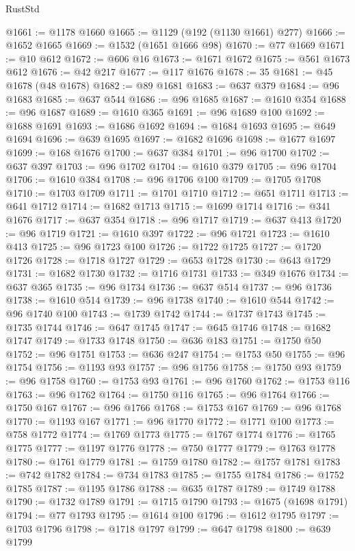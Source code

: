 \begin{lexlean}{RustStd}
\begin{coremodule}
@1661 := @1178 @1660
@1665 := @1129 (@192 (@1130 @1661) @277)
@1666 := @1652 @1665
@1669 := @1532 (@1651 @1666 @98)
@1670 := @77 @1669
@1671 := @10 @612
@1672 := @606 @16
@1673 := @1671 @1672
@1675 := @561 @1673 @612
@1676 := @42 @217
@1677 := @117 @1676
@1678 := 35
@1681 := @45 @1678 (@48 @1678)
@1682 := @89 @1681
@1683 := @637 @379
@1684 := @96 @1683
@1685 := @637 @544
@1686 := @96 @1685
@1687 := @1610 @354
@1688 := @96 @1687
@1689 := @1610 @365
@1691 := @96 @1689 @100
@1692 := @1688 @1691
@1693 := @1686 @1692
@1694 := @1684 @1693
@1695 := @649 @1694
@1696 := @639 @1695
@1697 := @1682 @1696
@1698 := @1677 @1697
@1699 := @168 @1676
@1700 := @637 @384
@1701 := @96 @1700
@1702 := @637 @397
@1703 := @96 @1702
@1704 := @1610 @379
@1705 := @96 @1704
@1706 := @1610 @384
@1708 := @96 @1706 @100
@1709 := @1705 @1708
@1710 := @1703 @1709
@1711 := @1701 @1710
@1712 := @651 @1711
@1713 := @641 @1712
@1714 := @1682 @1713
@1715 := @1699 @1714
@1716 := @341 @1676
@1717 := @637 @354
@1718 := @96 @1717
@1719 := @637 @413
@1720 := @96 @1719
@1721 := @1610 @397
@1722 := @96 @1721
@1723 := @1610 @413
@1725 := @96 @1723 @100
@1726 := @1722 @1725
@1727 := @1720 @1726
@1728 := @1718 @1727
@1729 := @653 @1728
@1730 := @643 @1729
@1731 := @1682 @1730
@1732 := @1716 @1731
@1733 := @349 @1676
@1734 := @637 @365
@1735 := @96 @1734
@1736 := @637 @514
@1737 := @96 @1736
@1738 := @1610 @514
@1739 := @96 @1738
@1740 := @1610 @544
@1742 := @96 @1740 @100
@1743 := @1739 @1742
@1744 := @1737 @1743
@1745 := @1735 @1744
@1746 := @647 @1745
@1747 := @645 @1746
@1748 := @1682 @1747
@1749 := @1733 @1748
@1750 := @636 @183
@1751 := @1750 @50
@1752 := @96 @1751
@1753 := @636 @247
@1754 := @1753 @50
@1755 := @96 @1754
@1756 := @1193 @93
@1757 := @96 @1756
@1758 := @1750 @93
@1759 := @96 @1758
@1760 := @1753 @93
@1761 := @96 @1760
@1762 := @1753 @116
@1763 := @96 @1762
@1764 := @1750 @116
@1765 := @96 @1764
@1766 := @1750 @167
@1767 := @96 @1766
@1768 := @1753 @167
@1769 := @96 @1768
@1770 := @1193 @167
@1771 := @96 @1770
@1772 := @1771 @100
@1773 := @758 @1772
@1774 := @1769 @1773
@1775 := @1767 @1774
@1776 := @1765 @1775
@1777 := @1197 @1776
@1778 := @750 @1777
@1779 := @1763 @1778
@1780 := @1761 @1779
@1781 := @1759 @1780
@1782 := @1757 @1781
@1783 := @742 @1782
@1784 := @734 @1783
@1785 := @1755 @1784
@1786 := @1752 @1785
@1787 := @1195 @1786
@1788 := @635 @1787
@1789 := @1749 @1788
@1790 := @1732 @1789
@1791 := @1715 @1790
@1793 := @1675 (@1698 @1791)
@1794 := @77 @1793
@1795 := @1614 @100
@1796 := @1612 @1795
@1797 := @1703 @1796
@1798 := @1718 @1797
@1799 := @647 @1798
@1800 := @639 @1799

\end{coremodule}
\end{lexlean}
